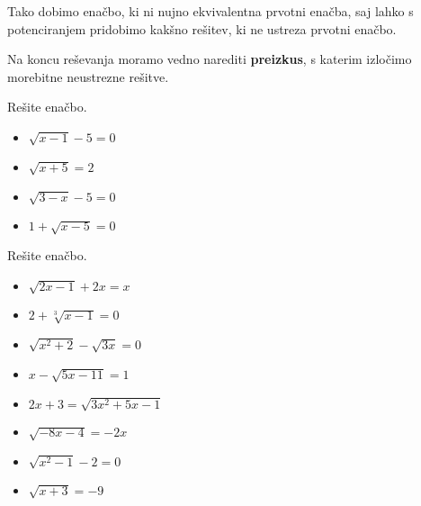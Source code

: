                Tako dobimo enačbo, ki ni nujno ekvivalentna prvotni enačba, saj lahko s potenciranjem pridobimo kakšno rešitev, ki ne ustreza prvotni enačbo.

                Na koncu reševanja moramo vedno narediti \textbf{preizkus}, s katerim izločimo morebitne neustrezne rešitve.
            
        



        
            \begin{naloga}
                Rešite enačbo.
                \begin{itemize}
                    \item $\displaystyle \sqrt{x-1}-5=0$ 
                    \item $\displaystyle \sqrt{x+5}=2$ 
                    \item $\displaystyle \sqrt{3-x}-5=0$ 
                    \item $\displaystyle 1+\sqrt{x-5}=0$ 
                \end{itemize}
            \end{naloga}

        
            \begin{naloga}
                Rešite enačbo.
                \begin{multicols}{2}
                    \begin{itemize}
                        \item $\displaystyle \sqrt{2x-1}+2x=x$ 
                        \item $\displaystyle 2+\sqrt[3]{x-1}=0$ 
                        \item $\displaystyle \sqrt{x^2+2}-\sqrt{3x}=0$ 
                        \item $\displaystyle x-\sqrt{5x-11}=1$ 
                        \item $\displaystyle 2x+3=\sqrt{3x^2+5x-1}$ 
                        \item $\displaystyle \sqrt{-8x-4}=-2x$ 
                        \item $\displaystyle \sqrt{x^2-1}-2=0$ 
                        \item $\displaystyle \sqrt{x+3}=-9$ 
                    \end{itemize}
                \end{multicols}
            \end{naloga}

